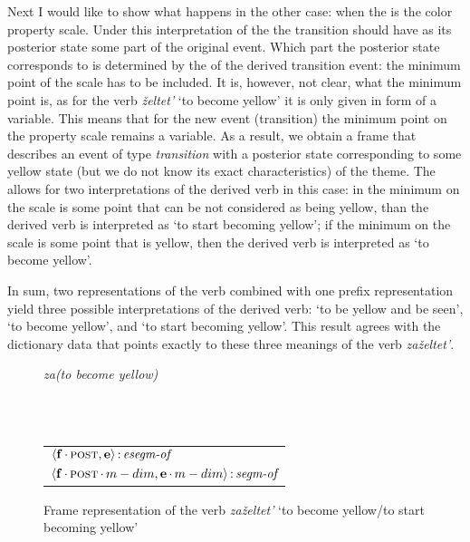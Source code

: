 Next I would like to show what happens in the other case: when the  is the color property scale. Under this interpretation of the  the transition should have as its posterior state some part of the original event. Which part the posterior state corresponds to is determined by the  of the derived transition event: the minimum point of the scale has to be included. It is, however, not clear, what the minimum point is, as for the verb \textit{\v{z}eltet'} `to become yellow' it is only given in form of a variable. This means that for the new event (transition) the minimum point on the property scale remains a variable. As a result, we obtain a frame that describes an event of type \textit{transition} with a posterior state corresponding to some yellow state (but we do not know its exact characteristics) of the theme. The  allows for two interpretations of the derived verb in this case: in the minimum on the scale is some point that can be not considered as being yellow, than the derived verb is interpreted as `to start becoming yellow'; if the minimum on the scale is some point that is yellow, then the derived verb is interpreted as `to become yellow'.

In sum, two representations of the verb combined with one prefix representation yield three possible interpretations of the derived verb: `to be yellow and be seen', `to become yellow', and `to start becoming yellow'. This result agrees with the dictionary data that points exactly to these three meanings of the verb \textit{za\v{z}eltet'}. 

\begin{figure}
\textit{za(to become yellow)}\\
\raggedright
{}\medskip\\
\medskip\\\centering
\begin{tabular}[t]{l}
$\langle{\textbf{\textrm{f}}\,{\cdot}\,\textsc{post},\textbf{\textrm{e}}}\rangle\,{:}\,\textit{esegm-of}$\\[1ex]
$\tuple{\btag{f}\BC\POST\C\MDIM,\btag{e}\BC\MDIM}\D\type{segm-of}$\\
\end{tabular}
\caption{Frame representation of the verb \textit{za\v{z}eltet'} `to become yellow/to start becoming yellow' \label{frame:zazeltet:yellow}}
\end{figure}

